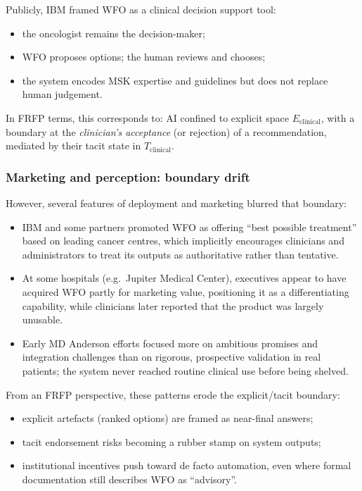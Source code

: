 Publicly, IBM framed WFO as a clinical decision support tool:

\begin{itemize}
  \item the oncologist remains the decision-maker;
  \item WFO proposes options; the human reviews and chooses;
  \item the system encodes MSK expertise and guidelines but does not replace
        human judgement.
\end{itemize}

In FRFP terms, this corresponds to:
AI confined to explicit space \(E_{\mathrm{clinical}}\),
with a boundary at the \emph{clinician’s acceptance} (or rejection) of
a recommendation, mediated by their tacit state in \(T_{\mathrm{clinical}}\).

\subsubsection*{Marketing and perception: boundary drift}

However, several features of deployment and marketing blurred that boundary:

\begin{itemize}
  \item IBM and some partners promoted WFO as offering ``best possible
        treatment'' based on leading cancer centres, which implicitly
        encourages clinicians and administrators to treat its outputs as
        authoritative rather than tentative.
  \item At some hospitals (e.g.\ Jupiter Medical Center), executives appear
        to have acquired WFO partly for marketing value, positioning it as a
        differentiating capability, while clinicians later reported that the
        product was largely unusable.
  \item Early MD Anderson efforts focused more on ambitious promises and
        integration challenges than on rigorous, prospective validation
        in real patients; the system never reached routine clinical use
        before being shelved.
\end{itemize}

From an FRFP perspective, these patterns erode the explicit/tacit boundary:

\begin{itemize}
  \item explicit artefacts (ranked options) are framed as near-final answers;
  \item tacit endorsement risks becoming a rubber stamp on system outputs;
  \item institutional incentives push toward de facto automation, even where
        formal documentation still describes WFO as ``advisory''.
\end{itemize}

